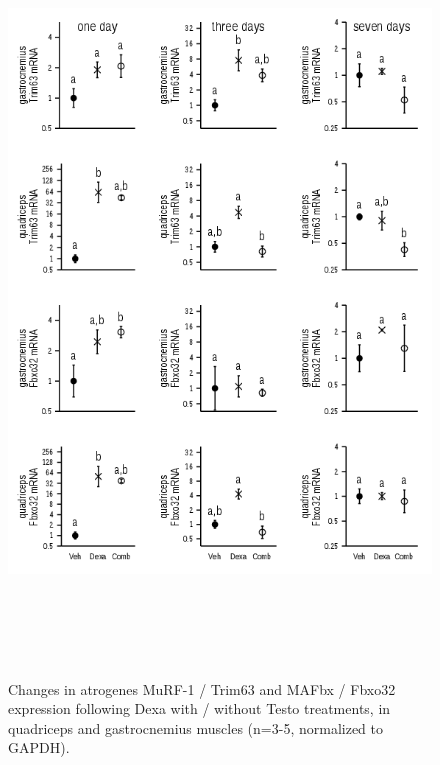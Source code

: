 \documentclass[12pt,english]{report}\usepackage[]{graphicx}\usepackage[]{color}
\newenvironment{knitrout}{}{} %
\begin{document}
\begin{figure}
\begin{knitrout}
\color{fgcolor}
\includegraphics[width=6in,height=8in]{figure/atrogenes-1} 

\end{knitrout}

\protect\caption[Changes in atrogenes MuRF-1 / Trim63 and MAFbx / Fbxo32 expression
following Dexa with / without Testo treatments]{Changes in atrogenes MuRF-1 / Trim63 and MAFbx / Fbxo32 expression
following Dexa with / without Testo treatments, in quadriceps and
gastrocnemius muscles (n=3-5, normalized to GAPDH).\label{fig:Atrogenes-expression}}
\end{figure}
\end{document}
